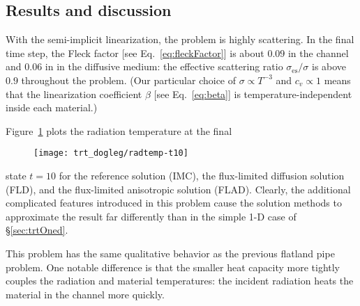 \subsection{Results and discussion}

With the semi-implicit linearization, the problem is highly scattering. In the
final time step, the Fleck factor [see Eq.~\eqref{eq:fleckFactor}] is about
$0.09$ in the channel and $0.06$ in in the diffusive medium: the effective
scattering ratio $\sigma_\text{es}/\sigma$ is above $0.9$ throughout the
problem. (Our particular choice of $\sigma \propto T^{-3}$ and $c_v \propto 1$
means that the linearization coefficient $\beta$ [see Eq.~\eqref{eq:beta}] is
temperature-independent inside each material.)

Figure~\ref{fig:doglegRadtempFinal} plots the radiation temperature at the final
\begin{figure}[htb]
  \centering
  \texttt{[image: trt\_dogleg/radtemp-t10]}
  \label{fig:doglegRadtempFinal}
\end{figure}
state $t=10$ for the reference solution (IMC), the flux-limited diffusion
solution (FLD), and the flux-limited anisotropic solution (FLAD). Clearly, the
additional complicated features introduced in this problem cause the solution
methods to approximate the result far differently than in the simple 1-D case of
\S\ref{sec:trtOned}.

This problem has the same qualitative behavior as the previous flatland pipe
problem. One notable difference is that the smaller heat capacity more tightly
couples the radiation and material temperatures: the incident radiation heats
the material in the channel more quickly.

